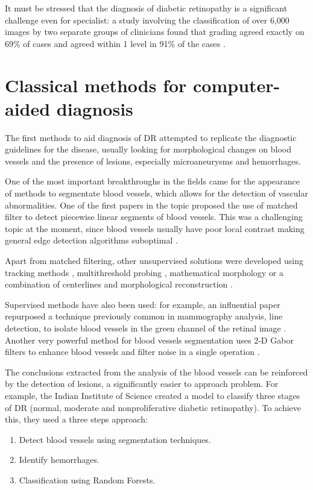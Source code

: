 It must be stressed that the diagnosis of diabetic retinopathy is a significant challenge even for specialist: a study involving the classification of over 6,000 images by two separate groups of clinicians found that grading agreed exactly on 69\% of cases and agreed within 1 level in 91\% of the cases \cite{gangaputra2013comparison}.

\section{Classical methods for computer-aided diagnosis}
The first methods to aid diagnosis of DR attempted to replicate the diagnostic guidelines for the disease, usually looking for morphological changes on blood vessels and the presence of lesions, especially microaneurysms and hemorrhages.

One of the most important breakthroughs in the fields came for the appearance of methods to segmentate blood vessels, which allows for the detection of vascular abnormalities. One of the first papers in the topic proposed the use of matched filter to detect piecewise linear segments of blood vessels. This was a challenging topic at the moment, since blood vessels usually have poor local contrast making general edge detection algorithms suboptimal \cite{chaudhuri1989detection}.

Apart from matched filtering, other unsupervised solutions were developed using tracking methods \cite{liu1993recursive, ali1999rapid}, multithreshold probing \cite{xiaoyi2003adaptive}, mathematical morphology \cite{zana2001segmentation} or a combination of centerlines and morphological reconstruction \cite{mendonca2006segmentation}. 

Supervised methods have also been used: for example, an influential paper repurposed a technique previously common in mammography analysis, line detection, to isolate blood vessels in the green channel of the retinal image \cite{ricci2007retinal}. Another very powerful method for blood vessels segmentation uses 2-D Gabor filters to enhance blood vessels and filter noise in a single operation \cite{soares2006retinal}.

The conclusions extracted from the analysis of the blood vessels can be reinforced by the detection of lesions, a significantly easier to approach problem. For example, the Indian Institute of Science created a model to classify three stages of DR (normal, moderate and nonproliferative diabetic retinopathy)\cite{verma2011detection}. To achieve this, they used a three steps approach:
\begin{enumerate}
    \item Detect blood vessels using segmentation techniques.
    \item Identify hemorrhages.
    \item Classification using Random Forests.
\end{enumerate}

